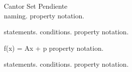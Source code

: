 \documentclass[../Main/main]{subfiles}
\begin{document}
{	
	
	












	

	Cantor Set Pendiente \\

	{
		{
			naming.
		}
		\denote
		{
			property \as notation.
		}
	}
	
	
	
	
	
	{
		{
			statements.
		}
		{
			conditions.
		}
		\denote
		{
			property \as notation.
		}
	}
	
	
	{
		{
		}
		{
			{
				{
					f(x) = Ax + p
				}
			}
		}
		\denote
		{
			property \as notation.
		}
	}
	

	{
		{
			statements.
		}
		{
			conditions.
		}
		\denote
		{
			property \as notation.
		}
	}
	
}
\end{document}

